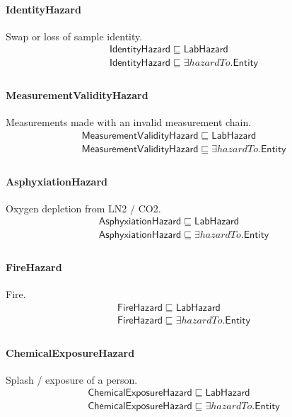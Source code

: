 \documentclass[10pt]{article}
\begin{document}
\paragraph{IdentityHazard} Swap or loss of sample identity.
\[\begin{array}{l}
\mathsf{IdentityHazard} \sqsubseteq  \mathsf{LabHazard} \\
\mathsf{IdentityHazard} \sqsubseteq  \exists \mathit{hazardTo}.\mathsf{Entity} \\
\end{array}\]
\paragraph{MeasurementValidityHazard} Measurements made with an invalid measurement chain.
\[\begin{array}{l}
\mathsf{MeasurementValidityHazard} \sqsubseteq  \mathsf{LabHazard} \\
\mathsf{MeasurementValidityHazard} \sqsubseteq  \exists \mathit{hazardTo}.\mathsf{Entity} \\
\end{array}\]
\paragraph{AsphyxiationHazard} Oxygen depletion from LN2 / CO2.
\[\begin{array}{l}
\mathsf{AsphyxiationHazard} \sqsubseteq  \mathsf{LabHazard} \\
\mathsf{AsphyxiationHazard} \sqsubseteq  \exists \mathit{hazardTo}.\mathsf{Entity} \\
\end{array}\]
\paragraph{FireHazard} Fire.
\[\begin{array}{l}
\mathsf{FireHazard} \sqsubseteq  \mathsf{LabHazard} \\
\mathsf{FireHazard} \sqsubseteq  \exists \mathit{hazardTo}.\mathsf{Entity} \\
\end{array}\]
\paragraph{ChemicalExposureHazard} Splash / exposure of a person.
\[\begin{array}{l}
\mathsf{ChemicalExposureHazard} \sqsubseteq  \mathsf{LabHazard} \\
\mathsf{ChemicalExposureHazard} \sqsubseteq  \exists \mathit{hazardTo}.\mathsf{Entity} \\
\end{array}\]
\end{document}

